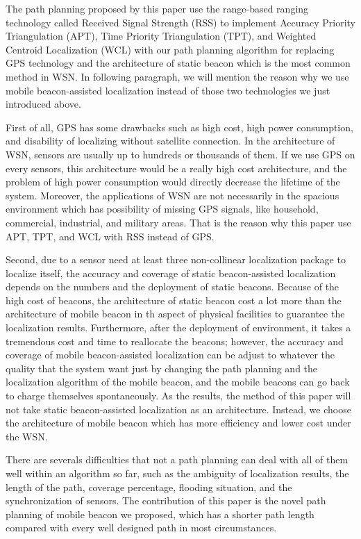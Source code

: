 \documentclass[conference]{IEEEtran}
\begin{document}
The path planning proposed by this paper use the range-based ranging technology called Received Signal Strength (RSS) to implement Accuracy Priority Triangulation (APT), Time Priority Triangulation (TPT), and Weighted Centroid Localization (WCL) with our path planning algorithm for replacing GPS technology and the architecture of static beacon which is the most common method in WSN. In following paragraph, we will mention the reason why we use mobile beacon-assisted localization instead of those two technologies we just introduced above.   

First of all, GPS has some drawbacks such as high cost, high power consumption, and disability of localizing without satellite connection. In the architecture of WSN, sensors are usually up to hundreds or thousands of them. If we use GPS on every sensors, this architecture would be a really high cost architecture, and the problem of high power consumption would directly decrease the lifetime of the system. Moreover, the applications of WSN are not necessarily in the spacious environment which has possibility of missing GPS signals, like household, commercial, industrial, and military areas. That is the reason why this paper use APT, TPT, and WCL with RSS instead of GPS. 

Second, due to a sensor need at least three non-collinear localization package to localize itself, the accuracy and coverage of static beacon-assisted localization depends on the numbers and the deployment of static beacons. Because of the high cost of beacons, the architecture of static beacon cost a lot more than the architecture of mobile beacon in th aspect of physical facilities to guarantee the localization results. Furthermore, after the deployment of environment, it takes a tremendous cost and time to reallocate the beacons; however, the accuracy and coverage of mobile beacon-assisted localization can be adjust to whatever the quality that the system want just by changing the path planning and the localization algorithm of the mobile beacon, and the mobile beacons can go back to charge  themselves spontaneously. As the results, the method of this paper will not take static beacon-assisted localization as an architecture. Instead, we choose the architecture of mobile beacon which has more efficiency and lower cost under the WSN. 

There are severals difficulties that not a path planning can deal with all of them well within an algorithm so far, such as the ambiguity of localization results, the length of the path, coverage percentage, flooding situation, and the synchronization of sensors. The contribution of this paper is the novel path planning of mobile beacon we proposed, which has a shorter path length compared with every well designed path in most circumstances. 
\end{document}
